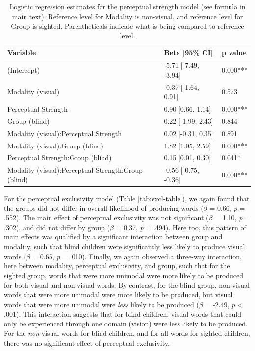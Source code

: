 \documentclass[
  man,floatsintext]{apa6}
\begin{document}
\begin{table}[H]

\caption{\label{tab:ps-table}Logistic regression estimates for the perceptual strength model (see formula in main text). Reference level for Modality is non-visual, and reference level for Group is sighted. Parentheticals indicate what is being compared to reference level.}
\centering
\begin{tabular}[t]{l|l|l}
\hline
Variable & Beta [95\% CI] & p value\\
\hline
(Intercept) & -5.71 [-7.49, -3.94] & 0.000***\\
\hline
Modality (visual) & -0.37 [-1.64, 0.91] & 0.573\\
\hline
Perceptual Strength & 0.90 [0.66, 1.14] & 0.000***\\
\hline
Group (blind) & 0.22 [-1.99, 2.43] & 0.844\\
\hline
Modality (visual):Perceptual Strength & 0.02 [-0.31, 0.35] & 0.891\\
\hline
Modality (visual):Group (blind) & 1.82 [1.05, 2.59] & 0.000***\\
\hline
Perceptual Strength:Group (blind) & 0.15 [0.01, 0.30] & 0.041*\\
\hline
Modality (visual):Perceptual Strength:Group (blind) & -0.56 [-0.75, -0.36] & 0.000***\\
\hline
\end{tabular}
\end{table}

For the perceptual exclusivity model (Table \ref{tab:excl-table}), we again found that the groups did not differ in overall likelihood of producing words (\(\beta\) = 0.66, \emph{p} = .552). The main effect of perceptual exclusivity was not significant (\(\beta\) = 1.10, \emph{p} = .302), and did not differ by group (\(\beta\) = 0.37, \emph{p} = .494). Here too, this pattern of main effects was qualified by a significant interaction between group and modality, such that blind children were significantly less likely to produce visual words (\(\beta\) = 0.65, \emph{p} = .010). Finally, we again observed a three-way interaction, here between modality, perceptual exclusivity, and group, such that for the sighted group, words that were more unimodal were more likely to be produced for both visual and non-visual words. By contrast, for the blind group, non-visual words that were more unimodal were more likely to be produced, but visual words that were more unimodal were \emph{less} likely to be produced (\(\beta\) = -2.49, \emph{p} \textless{} .001). This interaction suggests that for blind children, visual words that could only be experienced through one domain (vision) were less likely to be produced. For the \emph{non}-visual words for blind children, and for all words for sighted children, there was no significant effect of perceptual exclusivity.
\end{document}
